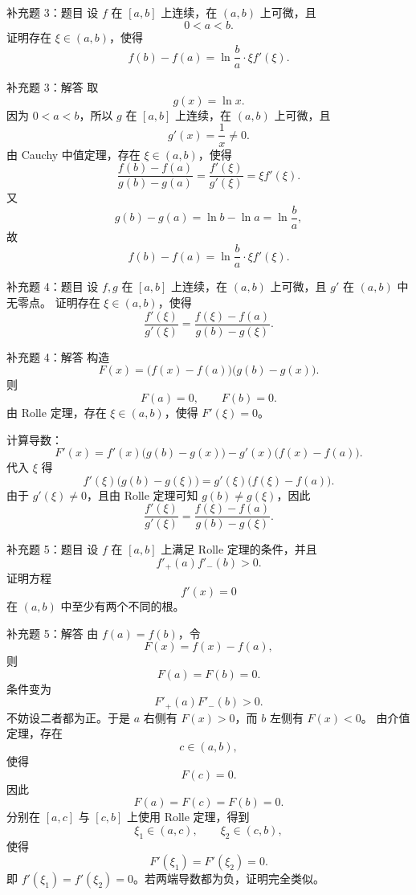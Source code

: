 \documentclass[aspectratio=169,10pt]{ctexbeamer}
\begin{document}
\begin{frame}[t]{补充题 3：题目}
\small
设 $f$ 在 $[a,b]$ 上连续，在 $(a,b)$ 上可微，且
\[
  0<a<b.
\]
证明存在 $\xi\in(a,b)$，使得
\[
  f(b)-f(a)=\ln\frac ba\cdot \xi f'(\xi).
\]
\end{frame}

\begin{frame}[t]{补充题 3：解答}
\small
取
\[
  g(x)=\ln x.
\]
因为 $0<a<b$，所以 $g$ 在 $[a,b]$ 上连续，在 $(a,b)$ 上可微，且
\[
  g'(x)=\frac1x\ne0.
\]
由 Cauchy 中值定理，存在 $\xi\in(a,b)$，使得
\[
  \frac{f(b)-f(a)}{g(b)-g(a)}
  =
  \frac{f'(\xi)}{g'(\xi)}
  =
  \xi f'(\xi).
\]
又
\[
  g(b)-g(a)=\ln b-\ln a=\ln\frac ba,
\]
故
\[
  f(b)-f(a)=\ln\frac ba\cdot \xi f'(\xi).
\]
\end{frame}

\begin{frame}[t]{补充题 4：题目}
\small
设 $f,g$ 在 $[a,b]$ 上连续，在 $(a,b)$ 上可微，且 $g'$ 在 $(a,b)$ 中无零点。
证明存在 $\xi\in(a,b)$，使得
\[
  \frac{f'(\xi)}{g'(\xi)}
  =
  \frac{f(\xi)-f(a)}{g(b)-g(\xi)}.
\]
\end{frame}

\begin{frame}[t]{补充题 4：解答}
\footnotesize
构造
\[
  F(x)=\bigl(f(x)-f(a)\bigr)\bigl(g(b)-g(x)\bigr).
\]
则
\[
  F(a)=0,\qquad F(b)=0.
\]
由 Rolle 定理，存在 $\xi\in(a,b)$，使得 $F'(\xi)=0$。

计算导数：
\[
  F'(x)
  =
  f'(x)\bigl(g(b)-g(x)\bigr)
  -g'(x)\bigl(f(x)-f(a)\bigr).
\]
代入 $\xi$ 得
\[
  f'(\xi)\bigl(g(b)-g(\xi)\bigr)
  =
  g'(\xi)\bigl(f(\xi)-f(a)\bigr).
\]
由于 $g'(\xi)\ne0$，且由 Rolle 定理可知 $g(b)\ne g(\xi)$，因此
\[
  \frac{f'(\xi)}{g'(\xi)}
  =
  \frac{f(\xi)-f(a)}{g(b)-g(\xi)}.
\]
\end{frame}

\begin{frame}[t]{补充题 5：题目}
\small
设 $f$ 在 $[a,b]$ 上满足 Rolle 定理的条件，并且
\[
  f'_+(a)f'_-(b)>0.
\]
证明方程
\[
  f'(x)=0
\]
在 $(a,b)$ 中至少有两个不同的根。
\end{frame}

\begin{frame}[t]{补充题 5：解答}
\footnotesize
由 $f(a)=f(b)$，令
\[
  F(x)=f(x)-f(a),
\]
则
\[
  F(a)=F(b)=0.
\]
条件变为
\[
  F'_+(a)F'_-(b)>0.
\]
不妨设二者都为正。于是 $a$ 右侧有 $F(x)>0$，而 $b$ 左侧有 $F(x)<0$。
由介值定理，存在
\[
  c\in(a,b),
\]
使得
\[
  F(c)=0.
\]
因此
\[
  F(a)=F(c)=F(b)=0.
\]
分别在 $[a,c]$ 与 $[c,b]$ 上使用 Rolle 定理，得到
\[
  \xi_1\in(a,c),\qquad \xi_2\in(c,b),
\]
使得
\[
  F'(\xi_1)=F'(\xi_2)=0.
\]
即 $f'(\xi_1)=f'(\xi_2)=0$。若两端导数都为负，证明完全类似。
\end{frame}
\end{document}
